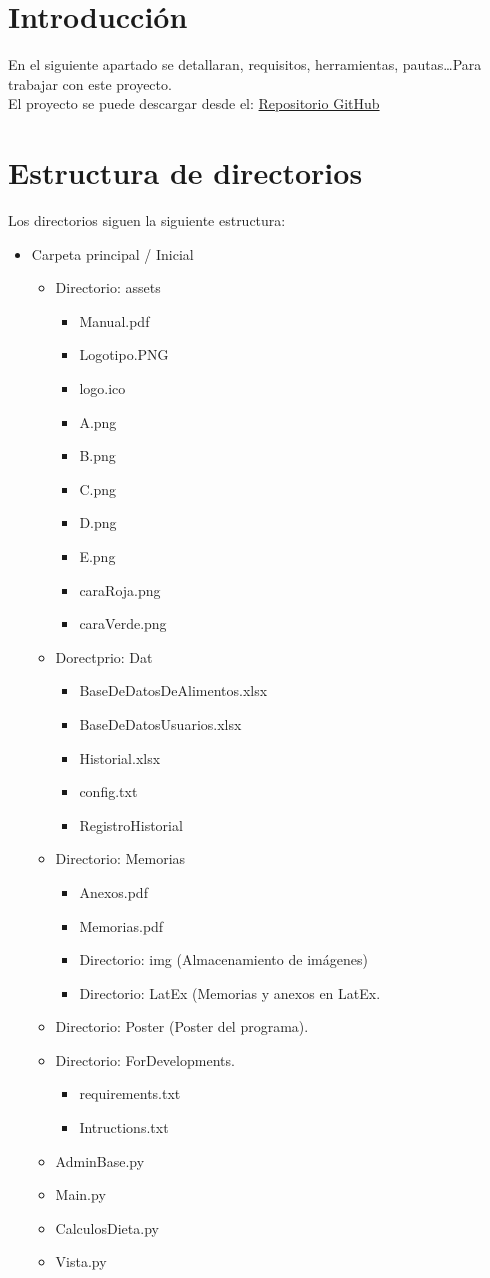 
\section{Introducción}
En el siguiente apartado se detallaran, requisitos, herramientas, pautas\ldots Para trabajar con este proyecto.\\
El proyecto se puede descargar desde el: \href{https://github.com/jct0024/HealthApp}{Repositorio GitHub}
\section{Estructura de directorios}
Los directorios siguen la siguiente estructura:
\begin{itemize}
\item Carpeta principal / Inicial
\begin{itemize}
\item Directorio: assets
\begin{itemize}
\item Manual.pdf
\item Logotipo.PNG
\item logo.ico
\item A.png
\item B.png
\item C.png
\item D.png
\item E.png
\item caraRoja.png
\item caraVerde.png
\end{itemize}
\item Dorectprio: Dat
\begin{itemize}
\item BaseDeDatosDeAlimentos.xlsx
\item BaseDeDatosUsuarios.xlsx
\item Historial.xlsx
\item config.txt
\item RegistroHistorial
\end{itemize}
\item Directorio: Memorias
\begin{itemize}
\item Anexos.pdf
\item Memorias.pdf
\item Directorio: img (Almacenamiento de imágenes)
\item Directorio: LatEx (Memorias y anexos en LatEx.
\end{itemize}
\item Directorio: Poster (Poster del programa).
\item Directorio: ForDevelopments.
\begin{itemize}
\item requirements.txt
\item Intructions.txt
\end{itemize}
\item AdminBase.py
\item Main.py
\item CalculosDieta.py
\item Vista.py
\end{itemize}
\end{itemize}
